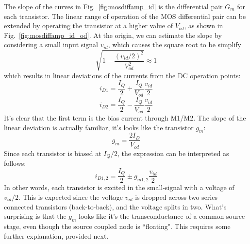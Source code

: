 The slope of the curves in Fig.~\ref{fig:mosdiffamp_id} is the differential pair $G_m$ for each transistor.   The linear range of operation of the MOS differential pair can be extended by operating the transistor at a higher value of $V_{od}$, as shown in Fig.~\ref{fig:mosdiffamp_id_od}.   At the origin, we can estimate the slope by considering a small input signal $v_{id}$, which causes the square root to be simplify
    \begin{equation} 
        \sqrt {1 - \frac{{{{({v_{id}}/2)}^2}}}{{V_{od}^2}}}  \approx 1
    \end{equation}
which results in linear deviations of the currents from the DC operation points:
    \begin{equation} 
        {i_{D1}} = \frac{I_Q}{2} + \frac{I_Q}{{{V_{od}}}}\frac{{{v_{id}}}}{2} 
    \end{equation}
    \begin{equation} 
        {i_{D2}} = \frac{I_Q}{2} - \frac{I_Q}{{{V_{od}}}}\frac{{{v_{id}}}}{2}
    \end{equation}
It's clear that the first term is the bias current through M1/M2.  The slope of the linear deviation is actually familiar, it's looks like the transistor $g_m$:
    \begin{equation}
        g_m = \frac{2 I_D}{V_{od}}
    \end{equation}
Since each transistor is biased at $I_Q/2$, the expression can be interpreted as follows:
    \begin{equation} 
        {i_{D1,2}} = \frac{I_Q}{2} \pm g_{m1,2} \frac{{{v_{id}}}}{2}
    \end{equation}
In other words, each transistor is excited in the small-signal with a voltage of $v_{id}/2$.  This is expected since the voltage $v_{id}$ is dropped across two series connected transistors (back-to-back), and the voltage splits in two.  What's surprising is that the $g_m$ looks like it's the transconductance of a common source stage, even though the source coupled node is ``floating".  This requires some further explanation, provided next.
